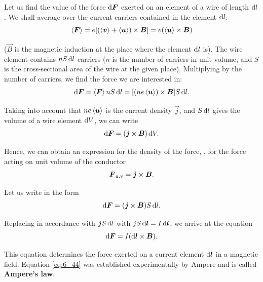 Let us find the value of the force $\mathrm{d}\boldsymbol{F}$ exerted on an element of a wire of length $\mathrm{d} l$. We shall average  over the current carriers contained in the element $\mathrm{d} l$:
\vspace{-12pt}
\begin{equation}\label{eq:6_41}
    \left\langle \boldsymbol{F} \right\rangle = e [(\left\langle \boldsymbol{v} \right\rangle + \left\langle \boldsymbol{u} \right\rangle) \times \boldsymbol{B}] = e (\left\langle \boldsymbol{u} \right\rangle \times \boldsymbol{B})
\end{equation}

\noindent
($\vec{B}$ is the magnetic induction at the place where the element $\mathrm{d} l$ is). The wire element contains $nS\,\mathrm{d} l$ carriers ($n$ is the number of carriers in unit volume, and $S$ is the cross-sectional area of the wire at the given place). Multiplying  by the number of carriers, we find the force we are interested in:
\begin{equation*}
    \mathrm{d}\boldsymbol{F} = \left\langle \boldsymbol{F} \right\rangle n S\, \mathrm{d} l = [(ne\left\langle \boldsymbol{u} \right\rangle) \times \boldsymbol{B}] S\, \mathrm{d} l.
\end{equation*}

\noindent
Taking into account that $ne\left\langle \boldsymbol{u} \right\rangle$ is the current density $\vec{j}$, and $S\,\mathrm{d} l$ gives the volume of a wire element $\mathrm{d} V$, we can write
\begin{equation}\label{eq:6_42}
    \mathrm{d}\boldsymbol{F} = (\boldsymbol{j}\times\boldsymbol{B})\, \mathrm{d} V.
\end{equation}

\noindent
Hence, we can obtain an expression for the density of the force, \ie, for the force acting on unit volume of the conductor
\begin{equation}\label{eq:6_43}
    \boldsymbol{F}_{\text{u.v}} = \boldsymbol{j}\times\boldsymbol{B}.
\end{equation}

Let us write  in the form
\begin{equation*}
    \mathrm{d}\boldsymbol{F} = (\boldsymbol{j}\times\boldsymbol{B}) S\, \mathrm{d} l.
\end{equation*}

\noindent
Replacing in accordance with  $\boldsymbol{j}S\,\mathrm{d} l$ with $jS\,\mathrm{d}\boldsymbol{l}= I\,\mathrm{d}\boldsymbol{l}$, we arrive at the equation
\begin{equation}\label{eq:6_44}
    \mathrm{d}\boldsymbol{F} = I (\mathrm{d}\boldsymbol{l} \times \boldsymbol{B}).
\end{equation}

\noindent
This equation determines the force exerted on a current element $\mathrm{d}\boldsymbol{l}$ in a magnetic field. Equation \eqref{eq:6_44} was established experimentally by Ampere and is called \textbf{Ampere's law}.

